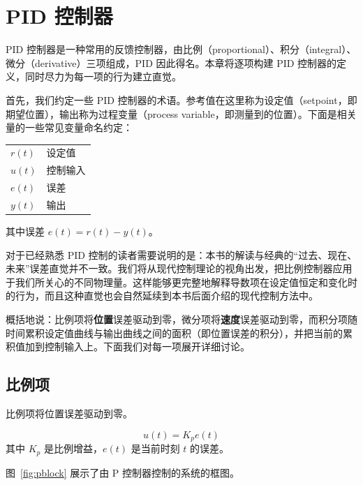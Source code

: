 ﻿
\chapter{PID 控制器}

PID 控制器是一种常用的反馈控制器，由比例（proportional）、积分（integral）、微分（derivative）三项组成，PID 因此得名。本章将逐项构建 PID 控制器的定义，同时尽力为每一项的行为建立直觉。

首先，我们约定一些 PID 控制器的术语。参考值在这里称为设定值（setpoint，即期望位置），输出称为过程变量（process variable，即测量到的位置）。下面是相关量的一些常见变量命名约定：

\begin{center}
\begin{tabular}{ll}
  $r(t)$ & 设定值 \\
  $u(t)$ & 控制输入 \\
  $e(t)$ & 误差 \\
  $y(t)$ & 输出 \\
\end{tabular}
\end{center}

其中误差 $e(t) = r(t) - y(t)$。

对于已经熟悉 PID 控制的读者需要说明的是：本书的解读与经典的``过去、现在、未来''误差直觉并不一致。我们将从现代控制理论的视角出发，把比例控制器应用于我们所关心的不同物理量。这样能够更完整地解释导数项在设定值恒定和变化时的行为，而且这种直觉也会自然延续到本书后面介绍的现代控制方法中。

概括地说：比例项将\textbf{位置}误差驱动到零，微分项将\textbf{速度}误差驱动到零，而积分项随时间累积设定值曲线与输出曲线之间的面积（即位置误差的积分），并把当前的累积值加到控制输入上。下面我们对每一项展开详细讨论。

\section{比例项}
\label{sec:ptermm}

比例项将位置误差驱动到零。

\begin{definition}[比例控制器]
\begin{equation}
  u(t) = K_p e(t)
\end{equation}
其中 $K_p$ 是比例增益，$e(t)$ 是当前时刻 $t$ 的误差。
\end{definition}

图~\ref{fig:pblock} 展示了由 P 控制器控制的系统的框图。


